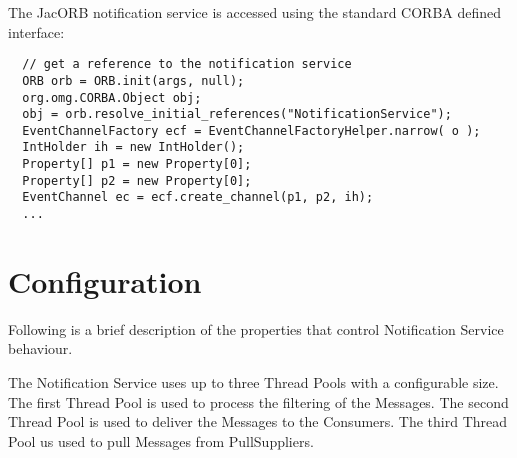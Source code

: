 The JacORB notification service is accessed using the standard CORBA
defined interface:

\small{
\begin{verbatim}
  // get a reference to the notification service
  ORB orb = ORB.init(args, null);
  org.omg.CORBA.Object obj; 
  obj = orb.resolve_initial_references("NotificationService");
  EventChannelFactory ecf = EventChannelFactoryHelper.narrow( o );
  IntHolder ih = new IntHolder();
  Property[] p1 = new Property[0];
  Property[] p2 = new Property[0];
  EventChannel ec = ecf.create_channel(p1, p2, ih);
  ...
\end{verbatim}
}

\section{Configuration}
\label{sec:ntfy-configuration}

Following is a brief description of the properties
that control Notification Service behaviour.

The Notification Service uses up to three Thread Pools with a configurable
size. The first Thread Pool is used to process the filtering of the
Messages. The second Thread Pool is used to deliver the Messages to the
Consumers. The third Thread Pool us used to pull Messages from PullSuppliers. 

